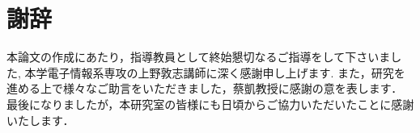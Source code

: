 \documentclass[../main.tex]{subfiles}
\begin{document}
\chapter*{謝辞}\label{sec:acknowledgment}
本論文の作成にあたり，指導教員として終始懇切なるご指導をして下さいました,
本学電子情報系専攻の上野敦志講師に深く感謝申し上げます.
また，研究を進める上で様々なご助言をいただきました，蔡凱教授に感謝の意を表します．\\
最後になりましたが，本研究室の皆様にも日頃からご協力いただいたことに感謝いたします．
\end{document}
